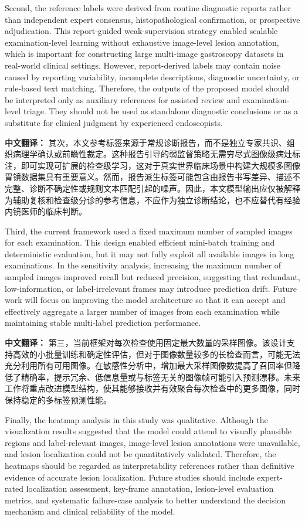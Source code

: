 \documentclass[Afour,sagev,times]{sagej}
\begin{document}
Second, the reference labels were derived from routine diagnostic reports rather than independent expert consensus, histopathological confirmation, or prospective adjudication. This report-guided weak-supervision strategy enabled scalable examination-level learning without exhaustive image-level lesion annotation, which is important for constructing large multi-image gastroscopy datasets in real-world clinical settings. However, report-derived labels may contain noise caused by reporting variability, incomplete descriptions, diagnostic uncertainty, or rule-based text matching. Therefore, the outputs of the proposed model should be interpreted only as auxiliary references for assisted review and examination-level triage. They should not be used as standalone diagnostic conclusions or as a substitute for clinical judgment by experienced endoscopists.

\textbf{中文翻译：} 其次，本文参考标签来源于常规诊断报告，而不是独立专家共识、组织病理学确认或前瞻性裁定。这种报告引导的弱监督策略无需穷尽式图像级病灶标注，即可实现可扩展的检查级学习，这对于真实世界临床场景中构建大规模多图像胃镜数据集具有重要意义。然而，报告派生标签可能包含由报告书写差异、描述不完整、诊断不确定性或规则文本匹配引起的噪声。因此，本文模型输出应仅被解释为辅助复核和检查级分诊的参考信息，不应作为独立诊断结论，也不应替代有经验内镜医师的临床判断。

Third, the current framework used a fixed maximum number of sampled images for each examination. This design enabled efficient mini-batch training and deterministic evaluation, but it may not fully exploit all available images in long examinations. In the sensitivity analysis, increasing the maximum number of sampled images improved recall but reduced precision, suggesting that redundant, low-information, or label-irrelevant frames may introduce prediction drift. Future work will focus on improving the model architecture so that it can accept and effectively aggregate a larger number of images from each examination while maintaining stable multi-label prediction performance.

\textbf{中文翻译：} 第三，当前框架对每次检查使用固定最大数量的采样图像。该设计支持高效的小批量训练和确定性评估，但对于图像数量较多的长检查而言，可能无法充分利用所有可用图像。在敏感性分析中，增加最大采样图像数提高了召回率但降低了精确率，提示冗余、低信息量或与标签无关的图像帧可能引入预测漂移。未来工作将重点改进模型结构，使其能够接收并有效聚合每次检查中的更多图像，同时保持稳定的多标签预测性能。

Finally, the heatmap analysis in this study was qualitative. Although the visualization results suggested that the model could attend to visually plausible regions and label-relevant images, image-level lesion annotations were unavailable, and lesion localization could not be quantitatively validated. Therefore, the heatmaps should be regarded as interpretability references rather than definitive evidence of accurate lesion localization. Future studies should include expert-rated localization assessment, key-frame annotation, lesion-level evaluation metrics, and systematic failure-case analysis to better understand the decision mechanism and clinical reliability of the model.
\end{document}
